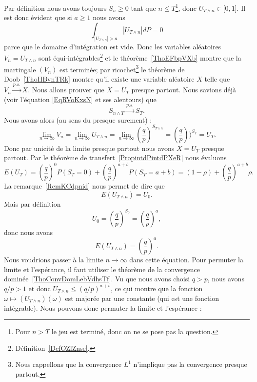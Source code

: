 Par définition nous avons toujours \( S_n\geq 0\) tant que \( n\leq T\)\footnote{Pour \( n>T\) le jeu est terminé, donc on ne se pose pas la question.}, donc \( U_{T\wedge n}\in\mathopen[ 0 , 1 \mathclose]\). Il est donc évident que si \( a\geq 1\) nous avons
\begin{equation}
	\int_{| U_{T\wedge n} |>a}| U_{T\wedge n} |dP=0
\end{equation}
parce que le domaine d'intégration est vide. Donc les variables aléatoires \( V_n=U_{T\wedge n}\) sont équi-intégrables\footnote{Définition~\ref{DefOZlZnse}.} et le théorème~\ref{ThoEFbpVXb} montre que la martingale \( (V_n)\) est terminée; par ricochet\footnote{Nous rappellons que la convergence \( L^1\) n'implique pas la convergence presque partout.} le théorème de Doob~\ref{ThoHBvnTRk} montre qu'il existe une variable aléatoire \( X\) telle que \( V_n\stackrel{p.s.}{\longrightarrow}X\). Nous allons prouver que \( X=U_T\) presque partout. Nous savions déjà (voir l'équation \eqref{EqRVoKxsN} et ses alentours) que
\begin{equation}
	S_{n\wedge T}\stackrel{p.s.}{\longrightarrow}S_T.
\end{equation}
Nous avons alors (au sens du presque surement) :
\begin{equation}
	\lim_{n\to \infty} V_n=\lim_{n\to \infty} U_{T\wedge n}=\lim_{n\to \infty} \left( \frac{ q }{ p } \right)^{S_{T\wedge n}}=\left( \frac{ q }{ p } \right))^{S_T}=U_T.
\end{equation}
Donc par unicité de la limite presque partout nous avons \( X=U_T\) presque partout. Par le théorème de transfert~\ref{PropintdPintdPXeR} nous évaluons
\begin{equation}    \label{EqYFycUag}
	E(U_T)=\left( \frac{ q }{ p } \right)^0P(S_T=0)+\left( \frac{ q }{ p } \right)^{a+b}P(S_T=a+b)=(1-\rho)+\left( \frac{ q }{ p } \right)^{a+b}\rho.
\end{equation}
La remarque~\ref{RemKCdpnid} nous permet de dire que
\begin{equation}
	E(U_{T\wedge n})=U_0.
\end{equation}
Mais par définition
\begin{equation}
	U_0=\left( \frac{ q }{ p } \right)^{S_0}=\left( \frac{ q }{ p } \right)^a,
\end{equation}
donc nous avons
\begin{equation}
	E(U_{T\wedge n})=\left( \frac{ q }{ p } \right)^a.
\end{equation}
Nous voudrions passer à la limite \( n\to \infty\) dans cette équation. Pour permuter la limite et l'espérance, il faut utiliser le théorème de la convergence dominée~\ref{ThoConvDomLebVdhsTf}. Vu que nous avons choisi \( q>p\), nous avons \( q/p>1\) et donc \( U_{T\wedge n}\leq (q/p)^{a+b}\), ce qui montre que la fonction \( \omega\mapsto (U_{T\wedge n})(\omega)\) est majorée par une constante (qui est une fonction intégrable). Nous pouvons donc permuter la limite et l'espérance :
